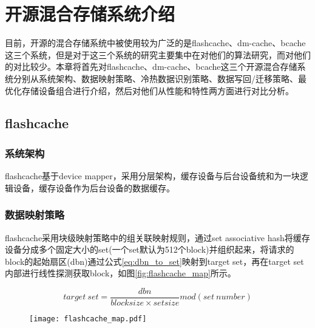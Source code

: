 
\chapter{开源混合存储系统介绍}
\label{chap:opensource_intro}

目前，开源的混合存储系统中被使用较为广泛的是flashcache、dm-cache、bcache这三个系统，但是对于这三个系统的研究主要集中在对他们的算法研究\cite{杨宗2013flashcache, 唐华敏2015bcache}，而对他们的对比较少。本章将首先对flashcache、dm-cache、bcache这三个开源混合存储系统分别从系统架构、数据映射策略、冷热数据识别策略、数据写回/迁移策略、最优化存储设备组合进行介绍，然后对他们从性能和特性两方面进行对比分析。

\section{flashcache}

\subsection{系统架构}

flashcache基于device mapper，采用分层架构，缓存设备与后台设备统和为一块逻辑设备，缓存设备作为后台设备的数据缓存。

\subsection{数据映射策略}
\label{sec:flashcache_mapping}
flashcache采用块级映射策略中的组关联映射规则，通过set associative hash\cite{kimmel2014set}将缓存设备分成多个固定大小的set(一个set默认为512个block)并组织起来，将请求的block的起始扇区(dbn)通过公式\ref{eq:dbn_to_set}映射到target set，再在target set内部进行线性探测获取block，如图\ref{fig:flashcache_map}所示。

\begin{equation}
    \label{eq:dbn_to_set}
    target \ set = \frac{dbn}{block size \times set size} mod (set \  number)
\end{equation}

\begin{figure}[!htp]
    \centering
    \texttt{[image: flashcache\_map.pdf]}
\end{figure}

